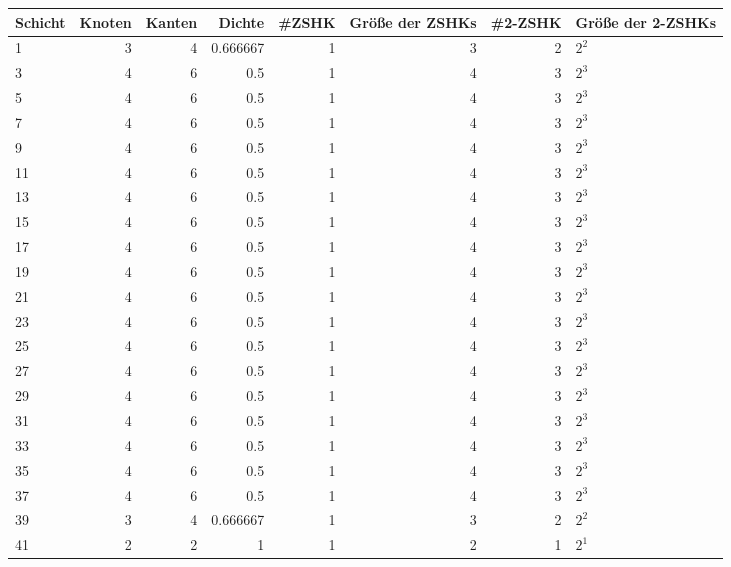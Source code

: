 \documentclass[10pt,a4paper]{standalone}
\begin{document}
\begin{tabular}{l|r|r|r|r|r|r|l|}
        Schicht & Knoten & Kanten & Dichte & \#ZSHK & Größe der ZSHKs & \#2-ZSHK & Größe der 2-ZSHKs \\ \hline
        1 & 3 & 4 & 0.666667 & 1 & 3 & 2 & $2^{2}$ \\ \hline
3 & 4 & 6 & 0.5 & 1 & 4 & 3 & $2^{3}$ \\ \hline
5 & 4 & 6 & 0.5 & 1 & 4 & 3 & $2^{3}$ \\ \hline
7 & 4 & 6 & 0.5 & 1 & 4 & 3 & $2^{3}$ \\ \hline
9 & 4 & 6 & 0.5 & 1 & 4 & 3 & $2^{3}$ \\ \hline
11 & 4 & 6 & 0.5 & 1 & 4 & 3 & $2^{3}$ \\ \hline
13 & 4 & 6 & 0.5 & 1 & 4 & 3 & $2^{3}$ \\ \hline
15 & 4 & 6 & 0.5 & 1 & 4 & 3 & $2^{3}$ \\ \hline
17 & 4 & 6 & 0.5 & 1 & 4 & 3 & $2^{3}$ \\ \hline
19 & 4 & 6 & 0.5 & 1 & 4 & 3 & $2^{3}$ \\ \hline
21 & 4 & 6 & 0.5 & 1 & 4 & 3 & $2^{3}$ \\ \hline
23 & 4 & 6 & 0.5 & 1 & 4 & 3 & $2^{3}$ \\ \hline
25 & 4 & 6 & 0.5 & 1 & 4 & 3 & $2^{3}$ \\ \hline
27 & 4 & 6 & 0.5 & 1 & 4 & 3 & $2^{3}$ \\ \hline
29 & 4 & 6 & 0.5 & 1 & 4 & 3 & $2^{3}$ \\ \hline
31 & 4 & 6 & 0.5 & 1 & 4 & 3 & $2^{3}$ \\ \hline
33 & 4 & 6 & 0.5 & 1 & 4 & 3 & $2^{3}$ \\ \hline
35 & 4 & 6 & 0.5 & 1 & 4 & 3 & $2^{3}$ \\ \hline
37 & 4 & 6 & 0.5 & 1 & 4 & 3 & $2^{3}$ \\ \hline
39 & 3 & 4 & 0.666667 & 1 & 3 & 2 & $2^{2}$ \\ \hline
41 & 2 & 2 & 1 & 1 & 2 & 1 & $2^{1}$ \\ \hline
\end{tabular}
\end{document}
